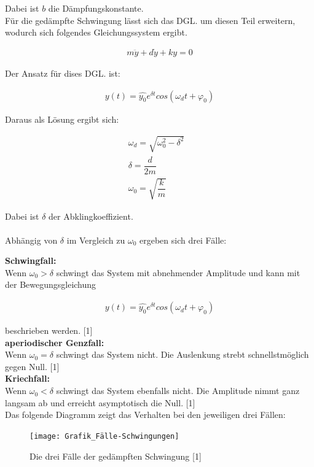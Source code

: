 \documentclass[a4paper]{scrartcl}
\numberwithin{equation}{subsection}
\begin{document}
Dabei ist $b$ die Dämpfungskonstante. \\ 
Für die gedämpfte Schwingung lässt sich das DGL. um diesen Teil erweitern, wodurch sich folgendes Gleichungssystem ergibt.

\begin{align}
m \ddot{y} + d \dot{y} + k y = 0 
\end{align}

Der Ansatz für dises DGL. ist:

\begin{align}
y(t) = \widehat{y_0} e^{\delta t} cos(\omega_d t + \varphi_0)
\end{align}

Daraus als Lösung ergibt sich:

\begin{align}
\omega_d = \sqrt{\omega_0^2 - \delta^2} &\\
\delta = \dfrac{d}{2m} &\\
\omega_0 = \sqrt{\dfrac{k}{m}}
\end{align}

Dabei ist $\delta$ der Abklingkoeffizient. \\ \\

Abhängig von $\delta$ im Vergleich zu $\omega_0$ ergeben sich drei Fälle:

\textbf{Schwingfall:}\\
Wenn $\omega_0 > \delta$ schwingt das System mit abnehmender Amplitude und kann mit der Bewegungsgleichung

\begin{align}
y(t) = \widehat{y_0} e^{\delta t} cos(\omega_d t + \varphi_0)
\end{align}

beschrieben werden. [1]\\ 

\textbf{aperiodischer Genzfall:}\\
Wenn $\omega_0 = \delta$ schwingt das System nicht. Die Auslenkung strebt schnellstmöglich gegen Null. [1]\\

\textbf{Kriechfall:}\\
Wenn $\omega_0 < \delta$ schwingt das System ebenfalls nicht. Die Amplitude nimmt ganz langsam ab und erreicht asymptotisch die Null. [1]\\


Das folgende Diagramm zeigt das Verhalten bei den jeweiligen drei Fällen:

\begin{figure}[H]
\texttt{[image: Grafik\_Fälle-Schwingungen]}
\centering
\caption{Die drei Fälle der gedämpften Schwingung [1]}
\centering
\end{figure}
\end{document}
